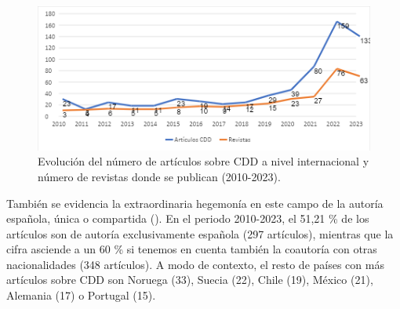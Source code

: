 \documentclass[spanish]{textolivre}
\begin{document}
\begin{figure}[h!]
    \centering
    \begin{minipage}{.8\textwidth} 
    \includegraphics[width=\linewidth]{images/image2.png}
    \caption{Evolución del número de artículos sobre CDD a nivel internacional y número de revistas donde se publican (2010-2023).}
    \label{fig-2}
    \end{minipage}
\end{figure}

También se evidencia la extraordinaria hegemonía en este campo de la autoría española, única o compartida (). En el periodo 2010-2023, el 51,21 \% de los artículos son de autoría exclusivamente española (297 artículos), mientras que la cifra asciende a un 60 \% si tenemos en cuenta también la coautoría con otras nacionalidades (348 artículos). A modo de contexto, el resto de países con más artículos sobre CDD son Noruega (33), Suecia (22), Chile (19), México (21), Alemania (17) o Portugal (15). 
\end{document}
